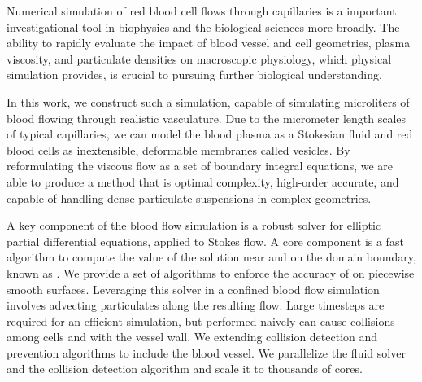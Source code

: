 
Numerical simulation of red blood cell flows through capillaries is a important investigational tool in biophysics and the biological sciences more broadly.
The ability to rapidly evaluate the impact of blood vessel and cell geometries, plasma viscosity, and particulate densities on macroscopic physiology, which physical simulation provides, is crucial to pursuing further biological understanding.

In this work, we construct such a simulation, capable of simulating microliters of blood flowing through realistic vasculature.
Due to the micrometer length scales of typical capillaries, we can model the blood plasma as a Stokesian fluid and red blood cells as inextensible, deformable membranes called vesicles.
By reformulating the viscous flow as a set of boundary integral equations, we are able to produce a method that is optimal complexity, high-order accurate, and capable of handling dense particulate suspensions in complex geometries.

A key component of the blood flow simulation is a robust solver for elliptic partial differential equations, applied to Stokes flow.
A core component is a fast algorithm to compute the value of the solution near and on the domain boundary, known as \qbkix.
We provide a set of algorithms to enforce the accuracy of \qbkix on piecewise smooth surfaces.
Leveraging this solver in a confined blood flow simulation involves advecting particulates along the resulting flow. 
Large timesteps are required for an efficient simulation, but performed naively can cause collisions among cells and with the vessel wall. 
We extending collision detection and prevention algorithms to include the blood vessel.
We parallelize the fluid solver and the collision detection algorithm and scale it to thousands of cores.


